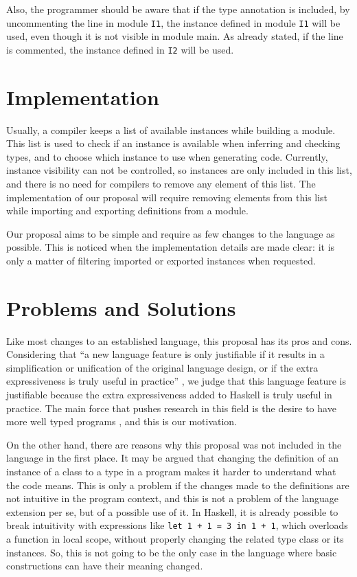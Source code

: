 \documentclass[msc]{ppgccufmg}
\begin{document}
Also, the programmer should be aware that if the type annotation is
included, by uncommenting the line in module \texttt{I1}, the instance
defined in module \texttt{I1} will be used, even though it is not
visible in module main.  As already stated, if the line is commented,
the instance defined in \texttt{I2} will be used.

\section{Implementation}
\label{Implementation}
Usually, a compiler keeps a list of available instances while building a
module.  This list is used to check if an instance is available when inferring and
checking types, and to choose which instance to use when generating code.
Currently, instance visibility can not be controlled, so instances are only
included in this list, and there is no need for compilers to remove any element
of this list.  The implementation of our proposal will require removing
elements from this list while importing and exporting definitions from a module.

Our proposal aims to be simple and require as few changes to the
language as possible. This is noticed when the implementation details
are made clear: it is only a matter of filtering imported or exported
instances when requested.

\section{Problems and Solutions}
\label{problems}
Like most changes to an established language, this proposal has
its pros and cons.  Considering that ``a new language feature is only
justifiable if it results in a simplification or unification of the
original language design, or if the extra expressiveness is truly
useful in practice'' \citep[p.~1]{tc}, we judge that this language
feature is justifiable because the extra expressiveness added to
Haskell is truly useful in practice.  The main force that pushes
research in this field is the desire to have more well typed programs
\citep[p.~3]{pierce}, and this is our motivation.

On the other hand, there are reasons why this proposal was not included in the
language in the first place.  
It may be argued that changing the definition of
an instance of a class to a type in a program makes it harder to understand
what the code means.  
This is only a problem if the changes made to the
definitions are not intuitive in the program context, and this is not a problem
of the language extension per se, but of a possible use of it.  In Haskell,
it is already possible to break intuitivity with expressions like \texttt{let 1 + 1 = 3
in 1 + 1}, which overloads a function in local scope, without properly changing
the related type class or its instances.  So, this is not going to be the only
case in the language where basic constructions can have their meaning changed.
\end{document}
